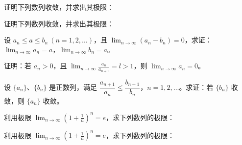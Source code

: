 \noindent\begin{minipage}{\textwidth}
证明下列数列收敛，并求出其极限：
\end{minipage}\par\vfill
\newpage
\noindent\begin{minipage}{\textwidth}
证明下列数列收敛，并求出其极限：
\end{minipage}\par\vfill
\noindent\begin{minipage}{\textwidth}
设 $a_n\le a\le b_n\ (n=1,2,\ldots)$，且 $\displaystyle\lim_{n\to\infty}(a_n-b_n)=0$，求证：$\displaystyle\lim_{n\to\infty}a_n=a$，$\displaystyle\lim_{n\to\infty}b_n=a$。
\end{minipage}\par\vfill
\noindent\begin{minipage}{\textwidth}
证明：若 $a_n>0$，且 $\displaystyle\lim_{n\to\infty}\frac{a_n}{a_{n+1}}=l>1$，则 $\displaystyle\lim_{n\to\infty}a_n=0$。
\end{minipage}\par\vfill
\noindent\begin{minipage}{\textwidth}
设 $\{a_n\}$、$\{b_n\}$ 是正数列，满足 $\dfrac{a_{n+1}}{a_n}\le\dfrac{b_{n+1}}{b_n}$，$n=1,2,\ldots$。求证：若 $\{b_n\}$ 收敛，则 $\{a_n\}$ 收敛。
\end{minipage}\par\vfill
\newpage
\noindent\begin{minipage}{\textwidth}
利用极限 $\displaystyle\lim_{n\to\infty}\left(1+\frac1n\right)^n=e$，求下列数列的极限：
\end{minipage}\par\vfill
\noindent\begin{minipage}{\textwidth}
利用极限 $\displaystyle\lim_{n\to\infty}\left(1+\frac1n\right)^n=e$，求下列数列的极限：
\end{minipage}\par\vfill
